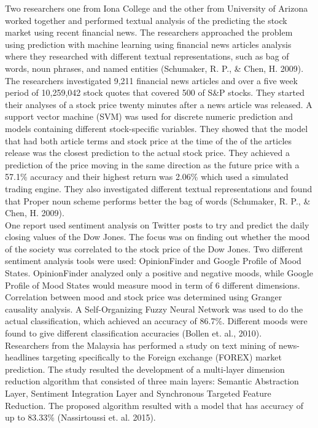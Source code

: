 \documentclass[11pt,a4paper]{article}
\begin{document}
Two researchers one from Iona College and the other from University of Arizona worked together and performed textual analysis of the predicting the stock market using recent financial news. The researchers approached the problem using prediction with machine learning using financial news articles analysis where they researched with different textual representations, such as bag of words, noun phrases, and named entities (Schumaker, R. P., \& Chen, H. 2009).\\

The researchers investigated 9,211 financial news articles and over a five week period of 10,259,042 stock quotes that covered 500 of S\&P stocks. They started their analyses of a stock price twenty minutes after a news article was released. A support vector machine (SVM) was used for discrete numeric prediction and models containing different stock-specific variables. They showed that the model that had both article terms and stock price at the time of the of the articles release was the closest prediction to the actual stock price. They achieved a prediction of the price moving in the same direction as the future price with a 57.1\% accuracy and their highest return was 2.06\% which used a simulated trading engine. They also investigated different textual representations and found that Proper noun scheme performs better the bag of words (Schumaker, R. P., \& Chen, H. 2009).\\

One report used sentiment analysis on Twitter posts to try and predict the daily closing values of the Dow Jones. The focus was on finding out whether the mood of the society was correlated to the stock price of the Dow Jones. Two different sentiment analysis tools were used: OpinionFinder and Google Profile of Mood States. OpinionFinder analyzed only a positive and negative moods, while Google Profile of Mood States would measure mood in term of 6 different dimensions. Correlation between mood and stock price was determined using Granger causality analysis. A Self-Organizing Fuzzy Neural Network was used to do the actual classification, which achieved an accuracy of 86.7\%. Different moods were found to give different classification accuracies (Bollen et. al., 2010).\\

Researchers from the Malaysia has performed a study on text mining of news-headlines targeting specifically to the Foreign exchange (FOREX) market prediction. The study resulted the development of a multi-layer dimension reduction algorithm that consisted of three main layers: Semantic Abstraction Layer, Sentiment Integration Layer and Synchronous Targeted Feature Reduction. The proposed algorithm resulted with a model that has accuracy of up to 83.33\% (Nassirtoussi et. al. 2015).\\
\end{document}
